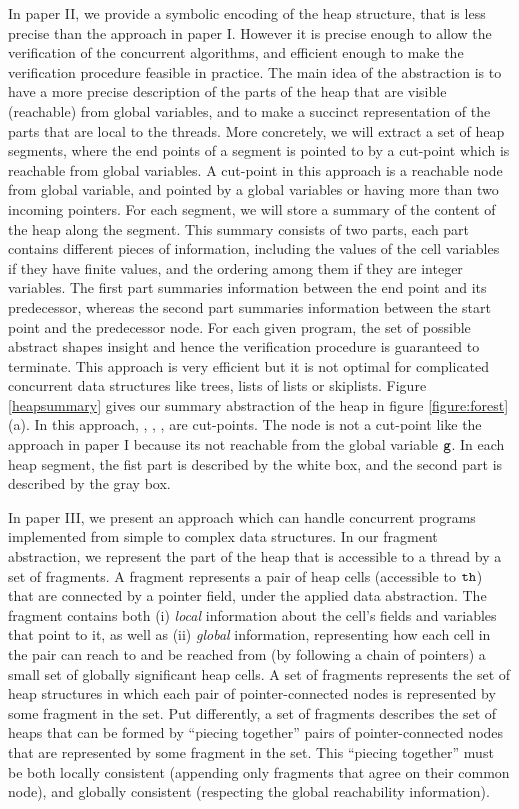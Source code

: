 In paper II, we provide a symbolic encoding of the heap structure, that is less precise than the approach in paper I. However it is precise enough to allow the verification of the concurrent algorithms, and efficient enough to make the verification procedure feasible in practice. The main idea of the abstraction is to have a more precise description of the parts of the heap that are visible (reachable) from global variables, and to make a succinct representation of the parts that are local to the threads. More concretely, we will extract a set of heap segments, where the end points of a segment is pointed to by a cut-point which is reachable from global variables. A cut-point in this approach is a reachable node from global variable, and pointed by a global variables or having more than two incoming pointers. For each segment, we will store a summary of the content of the heap along the segment. This summary consists of two parts, each part contains different pieces of information, including the values of the cell variables if they have finite values, and the ordering among them if they are integer variables. The first part summaries information between the end point and its predecessor, whereas the second part summaries information between the start point and the predecessor node. For each given program, the set of possible abstract shapes insight and hence the verification procedure is guaranteed to terminate. This approach is very efficient but it is not optimal for complicated concurrent data structures like trees, lists of lists or skiplists. Figure \ref{heapsummary} gives our summary abstraction of the heap in figure \ref{figure:forest}(a). In this approach, \nodea, \nodeb, \nodec, \nodee \; are cut-points. The node \noded \; is not a cut-point like the approach in paper I because its not reachable from the global variable $\tt g$. In each heap segment, the fist part is described by the white box, and the second part is described by the gray box.   

In paper III, we present an approach which can handle concurrent programs implemented from simple to complex data structures. In our fragment abstraction, we represent the part of the heap that is accessible to a thread by a set of fragments. A fragment represents a pair of heap cells (accessible to ${\tt th}$)
that are connected by a pointer field, under the applied data abstraction. The fragment contains both
(i) {\em local} information about the cell's fields and variables that
  point to it, as well as
(ii) {\em global} information, representing how
  each cell in the pair can reach to and be reached from
  (by following a chain of pointers) a small set of globally significant
  heap cells.
 A set of fragments represents the set of heap
structures in which each pair of pointer-connected nodes is represented by some
fragment in the set.
Put differently, a set of fragments describes the set of heaps that can be formed by
``piecing together'' pairs of pointer-connected nodes that are represented
by some fragment in the set. This ``piecing together'' must
be both locally consistent (appending only fragments that agree on their
common node), and globally consistent (respecting the global reachability
information).


